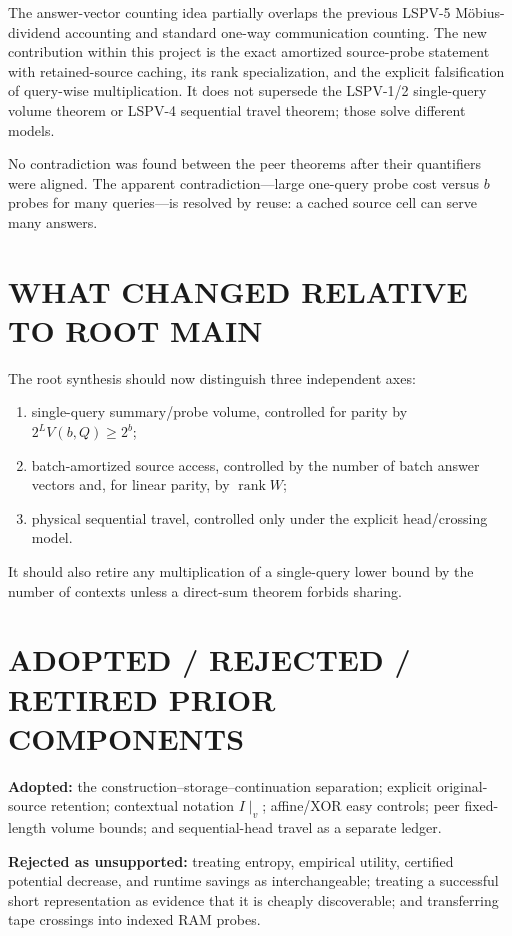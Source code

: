 \documentclass[11pt]{article}
\newcommand{\rank}{\operatorname{rank}}
\begin{document}
The answer-vector counting idea partially overlaps the previous LSPV-5 M\"obius-dividend accounting and standard one-way communication counting.  The new contribution within this project is the exact amortized source-probe statement with retained-source caching, its rank specialization, and the explicit falsification of query-wise multiplication.  It does not supersede the LSPV-1/2 single-query volume theorem or LSPV-4 sequential travel theorem; those solve different models.

No contradiction was found between the peer theorems after their quantifiers were aligned.  The apparent contradiction---large one-query probe cost versus $b$ probes for many queries---is resolved by reuse: a cached source cell can serve many answers.

\section{WHAT CHANGED RELATIVE TO ROOT MAIN}

The root synthesis should now distinguish three independent axes:
\begin{enumerate}[leftmargin=*]
\item single-query summary/probe volume, controlled for parity by $2^LV(b,Q)\ge2^b$;
\item batch-amortized source access, controlled by the number of batch answer vectors and, for linear parity, by $\rank W$;
\item physical sequential travel, controlled only under the explicit head/crossing model.
\end{enumerate}
It should also retire any multiplication of a single-query lower bound by the number of contexts unless a direct-sum theorem forbids sharing.

\section{ADOPTED / REJECTED / RETIRED PRIOR COMPONENTS}

\textbf{Adopted:} the construction--storage--continuation separation; explicit original-source retention; contextual notation $I\mid_v$; affine/XOR easy controls; peer fixed-length volume bounds; and sequential-head travel as a separate ledger.

\textbf{Rejected as unsupported:} treating entropy, empirical utility, certified potential decrease, and runtime savings as interchangeable; treating a successful short representation as evidence that it is cheaply discoverable; and transferring tape crossings into indexed RAM probes.
\end{document}
